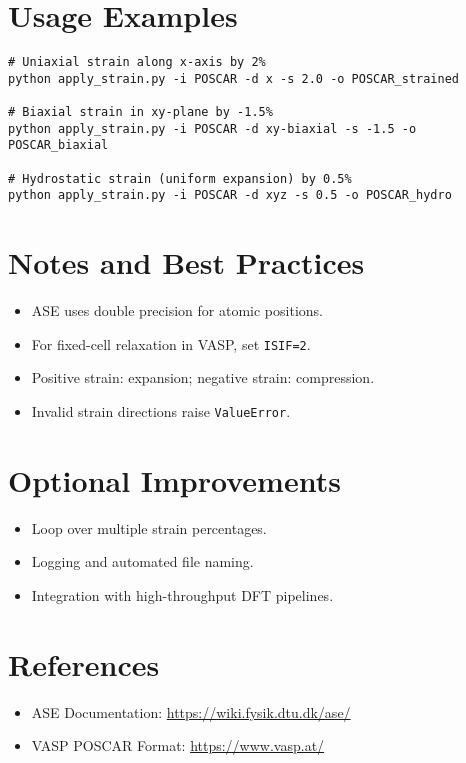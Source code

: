 \documentclass[12pt]{article}
\begin{document}
\section{Usage Examples}
\begin{verbatim}
# Uniaxial strain along x-axis by 2%
python apply_strain.py -i POSCAR -d x -s 2.0 -o POSCAR_strained

# Biaxial strain in xy-plane by -1.5%
python apply_strain.py -i POSCAR -d xy-biaxial -s -1.5 -o POSCAR_biaxial

# Hydrostatic strain (uniform expansion) by 0.5%
python apply_strain.py -i POSCAR -d xyz -s 0.5 -o POSCAR_hydro
\end{verbatim}

\section{Notes and Best Practices}
\begin{itemize}
    \item ASE uses double precision for atomic positions.
    \item For fixed-cell relaxation in VASP, set \texttt{ISIF=2}.
    \item Positive strain: expansion; negative strain: compression.
    \item Invalid strain directions raise \texttt{ValueError}.
\end{itemize}

\section{Optional Improvements}
\begin{itemize}
    \item Loop over multiple strain percentages.
    \item Logging and automated file naming.
    \item Integration with high-throughput DFT pipelines.
\end{itemize}

\section{References}
\begin{itemize}
    \item ASE Documentation: \url{https://wiki.fysik.dtu.dk/ase/}
    \item VASP POSCAR Format: \url{https://www.vasp.at/}
\end{itemize}
\end{document}
